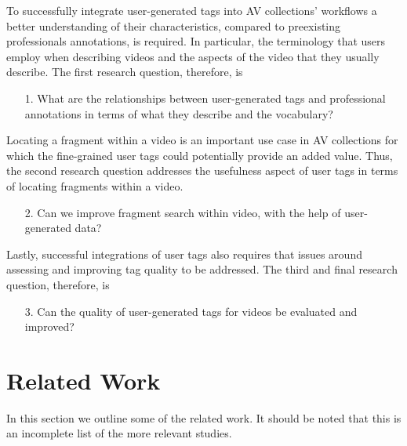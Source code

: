 To successfully integrate user-generated tags into AV collections' workflows a better understanding of their characteristics, compared to preexisting professionals annotations, is required. In particular,  the terminology that users employ when describing videos  and the aspects of the video that they usually describe. The first research question, therefore, is
\begin{itemize}
	\item[1.] What are the relationships between user-generated tags  and professional annotations in terms of what they describe and the vocabulary?
\end{itemize}
Locating a fragment within a video is an important use case in AV collections for which the fine-grained user tags could potentially provide an added value. Thus, the second research question addresses the usefulness aspect of user tags in terms of locating fragments within a video.
\begin{itemize}
	\item[2.] Can we improve fragment search  within video, with the help of user-generated data?
\end{itemize}

Lastly, successful integrations of user tags also requires that issues around assessing and improving tag quality to be addressed. The third and final research question, therefore, is
\begin{itemize}
	\item[3.] Can the quality of user-generated tags for videos be evaluated and improved?
\end{itemize}

\section{Related Work}
In this section we outline some of the related work. It should be noted that this is an incomplete list of the more relevant studies.
